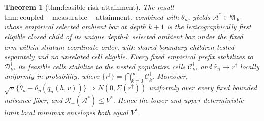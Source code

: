 \documentclass{article}
\newtheorem{theorem}{Theorem}
\begin{document}
\begin{theorem}[thm:feasible-risk-attainment]\label{thm:feasible-risk-attainment}
The result \(\mathrm{thm:coupled-measurable-attainment}\), combined with \(\widetilde\theta_n\), yields \(\mathcal A^*\in\mathfrak A_{\mathrm{det}}\) whose empirical selected ambient box at depth \(k+1\) is the lexicographically first eligible closed child of its unique depth-\(k\) selected ambient box under the fixed arm-within-stratum coordinate order, with shared-boundary children tested separately and no unrelated cell eligible. Every fixed empirical prefix stabilizes to \(\mathcal D_k^\dagger\), its feasible cells stabilize to the nested population cells \(\mathcal C_k^\dagger\), and \(\widehat r_n\to r^\dagger\) locally uniformly in probability, where \(\{r^\dagger\}=\bigcap_{k=0}^{\infty}\mathcal C_k^\dagger\). Moreover, \(\sqrt n\{\widetilde\theta_n-\theta_p(q_n(h,v))\}\Rightarrow N(0,\Sigma(r^\dagger))\) uniformly over every fixed bounded nuisance fiber, and \(\mathcal R_+(\mathcal A^*)\le V^*\). Hence the lower and upper deterministic-limit local minimax envelopes both equal \(V^*\).
\end{theorem}
\end{document}
